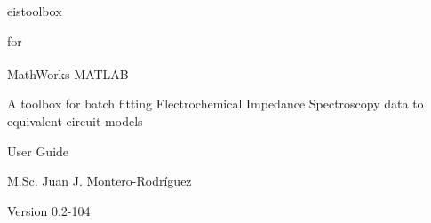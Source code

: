 \documentclass[10pt,b5paper,oneside]{book}
\begin{document}
\setlength{\parindent}{0pt}
\setlength{\parskip}{6pt}

\frontmatter

\begin{titlepage}


\begin{center}
	\Large eistoolbox \par
\end{center}
\begin{center}
	\large for \par
\end{center}
\begin{center}
	\Large MathWorks\textsuperscript{\textregistered} MATLAB \par
\end{center}

\vspace*{2cm}

\begin{center}
	\large A toolbox for batch fitting Electrochemical Impedance Spectroscopy data to equivalent circuit models
\end{center} 

\vspace*{2cm}

\begin{center}
	\Large User Guide \par
\end{center}
\begin{center}
	\large M.Sc. Juan J. Montero-Rodríguez \par
\end{center}

\vspace*{2cm}

\begin{center}
	\Large Version 0.2-104
\end{center}

\end{titlepage}

\clearpage

\tableofcontents

\mainmatter
\pagestyle{mmatter}
\end{document}
